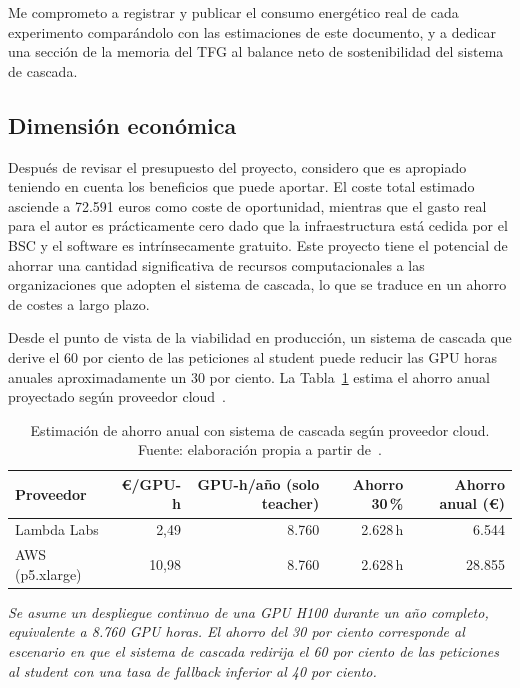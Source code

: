 Me comprometo a registrar y publicar el consumo energético real de cada experimento comparándolo con las estimaciones de este documento, y a dedicar una sección de la memoria del TFG al balance neto de sostenibilidad del sistema de cascada.

\subsection{Dimensión económica}

Después de revisar el presupuesto del proyecto, considero que es apropiado teniendo en cuenta los beneficios que puede aportar. El coste total estimado asciende a 72.591 euros como coste de oportunidad, mientras que el gasto real para el autor es prácticamente cero dado que la infraestructura está cedida por el BSC y el software es intrínsecamente gratuito. Este proyecto tiene el potencial de ahorrar una cantidad significativa de recursos computacionales a las organizaciones que adopten el sistema de cascada, lo que se traduce en un ahorro de costes a largo plazo.

Desde el punto de vista de la viabilidad en producción, un sistema de cascada que derive el 60 por ciento de las peticiones al student puede reducir las GPU horas anuales aproximadamente un 30 por ciento. La Tabla~\ref{tab:ahorro-cascada} estima el ahorro anual proyectado según proveedor cloud~\cite{lambda2026,aws2026}.

\begin{table}[H]
\centering
\caption{Estimación de ahorro anual con sistema de cascada según proveedor cloud. Fuente: elaboración propia a partir de~\cite{lambda2026,aws2026}.}
\label{tab:ahorro-cascada}
\footnotesize
\begin{tabular}{l r r r r}
\toprule
\textbf{Proveedor} & \textbf{\euro{}/GPU-h} & \textbf{GPU-h/año (solo teacher)} & \textbf{Ahorro 30\,\%} & \textbf{Ahorro anual (\euro{})} \\
\midrule
Lambda Labs  & 2,49  & 8.760 & 2.628\,h & 6.544 \\
AWS (p5.xlarge) & 10,98 & 8.760 & 2.628\,h & 28.855 \\
\bottomrule
\end{tabular}
\end{table}

\noindent\textit{\scriptsize Se asume un despliegue continuo de una GPU H100 durante un año completo, equivalente a 8.760 GPU horas. El ahorro del 30 por ciento corresponde al escenario en que el sistema de cascada redirija el 60 por ciento de las peticiones al student con una tasa de fallback inferior al 40 por ciento.}

